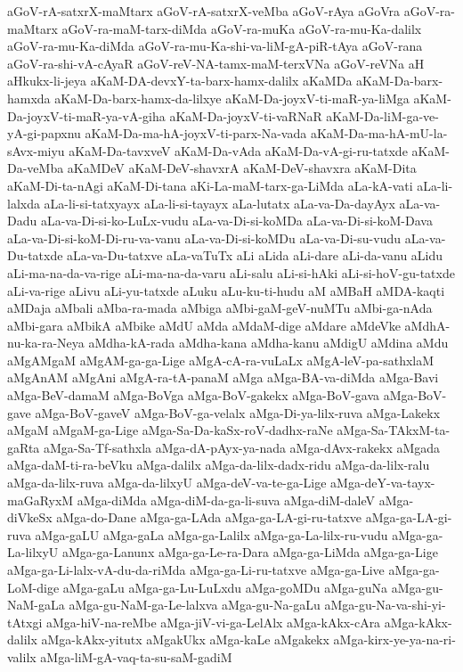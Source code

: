 {aGoV-rA-satxrX-maMtarx
aGoV-rA-satxrX-veMba
aGoV-rAya
aGoVra
aGoV-ra-maMtarx
aGoV-ra-maM-tarx-diMda
aGoV-ra-muKa
aGoV-ra-mu-Ka-dalilx
aGoV-ra-mu-Ka-diMda
aGoV-ra-mu-Ka-shi-va-liM-gA-piR-tAya
aGoV-rana
aGoV-ra-shi-vA-cAyaR
aGoV-reV-NA-tamx-maM-terxVNa
aGoV-reVNa
aH
aHkukx-li-jeya
aKaM-DA-devxY-ta-barx-hamx-dalilx
aKaMDa
aKaM-Da-barx-hamxda
aKaM-Da-barx-hamx-da-lilxye
aKaM-Da-joyxV-ti-maR-ya-liMga
aKaM-Da-joyxV-ti-maR-ya-vA-giha
aKaM-Da-joyxV-ti-vaRNaR
aKaM-Da-liM-ga-ve-yA-gi-papxnu
aKaM-Da-ma-hA-joyxV-ti-parx-Na-vada
aKaM-Da-ma-hA-mU-la-sAvx-miyu
aKaM-Da-tavxveV
aKaM-Da-vAda
aKaM-Da-vA-gi-ru-tatxde
aKaM-Da-veMba
aKaMDeV
aKaM-DeV-shavxrA
aKaM-DeV-shavxra
aKaM-Dita
aKaM-Di-ta-nAgi
aKaM-Di-tana
aKi-La-maM-tarx-ga-LiMda
aLa-kA-vati
aLa-li-lalxda
aLa-li-si-tatxyayx
aLa-li-si-tayayx
aLa-lutatx
aLa-va-Da-dayAyx
aLa-va-Dadu
aLa-va-Di-si-ko-LuLx-vudu
aLa-va-Di-si-koMDa
aLa-va-Di-si-koM-Dava
aLa-va-Di-si-koM-Di-ru-va-vanu
aLa-va-Di-si-koMDu
aLa-va-Di-su-vudu
aLa-va-Du-tatxde
aLa-va-Du-tatxve
aLa-vaTuTx
aLi
aLida
aLi-dare
aLi-da-vanu
aLidu
aLi-ma-na-da-va-rige
aLi-ma-na-da-varu
aLi-salu
aLi-si-hAki
aLi-si-hoV-gu-tatxde
aLi-va-rige
aLivu
aLi-yu-tatxde
aLuku
aLu-ku-ti-hudu
aM
aMBaH
aMDA-kaqti
aMDaja
aMbali
aMba-ra-mada
aMbiga
aMbi-gaM-geV-nuMTu
aMbi-ga-nAda
aMbi-gara
aMbikA
aMbike
aMdU
aMda
aMdaM-dige
aMdare
aMdeVke
aMdhA-nu-ka-ra-Neya
aMdha-kA-rada
aMdha-kana
aMdha-kanu
aMdigU
aMdina
aMdu
aMgAMgaM
aMgAM-ga-ga-Lige
aMgA-cA-ra-vuLaLx
aMgA-leV-pa-sathxlaM
aMgAnAM
aMgAni
aMgA-ra-tA-panaM
aMga
aMga-BA-va-diMda
aMga-Bavi
aMga-BeV-damaM
aMga-BoVga
aMga-BoV-gakekx
aMga-BoV-gava
aMga-BoV-gave
aMga-BoV-gaveV
aMga-BoV-ga-velalx
aMga-Di-ya-lilx-ruva
aMga-Lakekx
aMgaM
aMgaM-ga-Lige
aMga-Sa-Da-kaSx-roV-dadhx-raNe
aMga-Sa-TAkxM-ta-gaRta
aMga-Sa-Tf-sathxla
aMga-dA-pAyx-ya-nada
aMga-dAvx-rakekx
aMgada
aMga-daM-ti-ra-beVku
aMga-dalilx
aMga-da-lilx-dadx-ridu
aMga-da-lilx-ralu
aMga-da-lilx-ruva
aMga-da-lilxyU
aMga-deV-va-te-ga-Lige
aMga-deY-va-tayx-maGaRyxM
aMga-diMda
aMga-diM-da-ga-li-suva
aMga-diM-daleV
aMga-diVkeSx
aMga-do-Dane
aMga-ga-LAda
aMga-ga-LA-gi-ru-tatxve
aMga-ga-LA-gi-ruva
aMga-gaLU
aMga-gaLa
aMga-ga-Lalilx
aMga-ga-La-lilx-ru-vudu
aMga-ga-La-lilxyU
aMga-ga-Lanunx
aMga-ga-Le-ra-Dara
aMga-ga-LiMda
aMga-ga-Lige
aMga-ga-Li-lalx-vA-du-da-riMda
aMga-ga-Li-ru-tatxve
aMga-ga-Live
aMga-ga-LoM-dige
aMga-gaLu
aMga-ga-Lu-LuLxdu
aMga-goMDu
aMga-guNa
aMga-gu-NaM-gaLa
aMga-gu-NaM-ga-Le-lalxva
aMga-gu-Na-gaLu
aMga-gu-Na-va-shi-yi-tAtxgi
aMga-hiV-na-reMbe
aMga-jiV-vi-ga-LelAlx
aMga-kAkx-cAra
aMga-kAkx-dalilx
aMga-kAkx-yitutx
aMgakUkx
aMga-kaLe
aMgakekx
aMga-kirx-ye-ya-na-ri-valilx
aMga-liM-gA-vaq-ta-su-saM-gadiM
}

